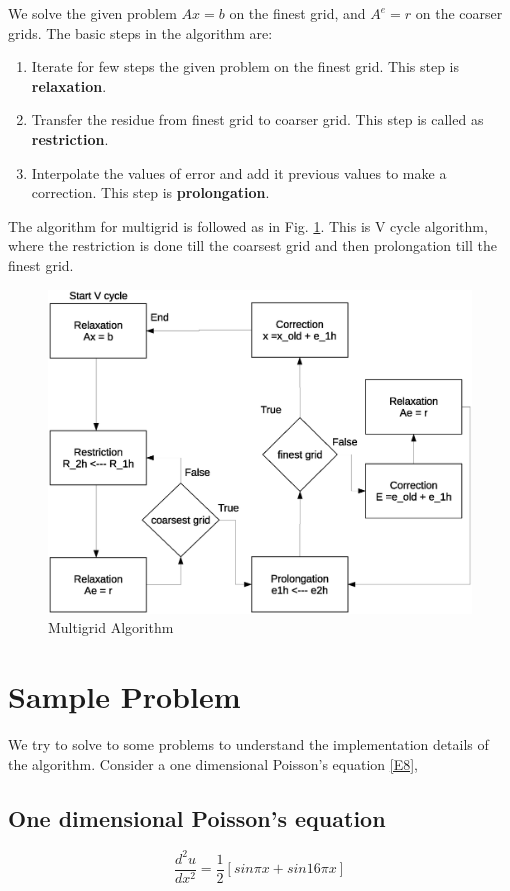 We solve the given problem $Ax = b$ on the finest grid, and $A^e = r$ on the coarser grids. The basic steps in the algorithm are:
\begin{enumerate}
 \item Iterate for few steps the given problem on the finest grid. This step is \textbf{relaxation}. 
 \item Transfer the residue from finest grid to coarser grid. This step is called as \textbf{restriction}.
  \item Interpolate the values of error and add it previous values to make a correction. This step is
    \textbf{prolongation}.
\end{enumerate}

The algorithm for multigrid is followed as in Fig. \ref{Fig:fd_mg}. This is V cycle algorithm, where the restriction is done till the coarsest grid and then prolongation till 
the finest grid.%
\begin{figure}
 \centering
 \includegraphics[scale=0.5]{fd_mg.eps}
 \caption{Multigrid Algorithm}
 \label{Fig:fd_mg}
\end{figure}

\section{Sample Problem}

We try to solve to some problems to understand the implementation details of the algorithm. Consider a one dimensional Poisson's equation \ref{E8},
\subsection{One dimensional Poisson's equation}
\begin{equation}
 \frac{d^2 u}{dx^2} = \frac{1}{2}[sin \pi x + sin 16 \pi x]
 \label{E8}
\end{equation}

